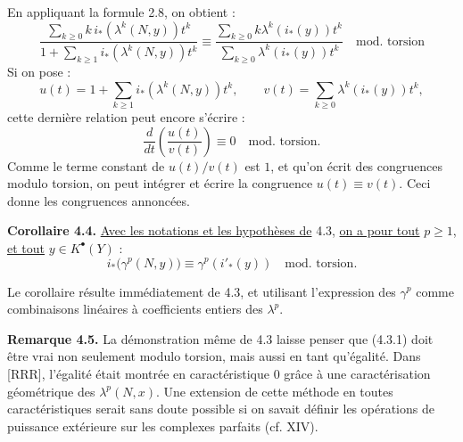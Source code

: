 
En
appliquant la formule 2.8, on obtient :
\[
  \frac{\sum_{k\ge0}k\,i_*(\lambda^k(N,y))t^k}
       {1+\sum_{k\ge1} i_*(\lambda^k(N,y))t^k}
  \equiv
  \frac{\sum_{k\ge0}k\lambda^k(i_*(y))t^k}
       {\sum_{k\ge0}\lambda^k(i_*(y))t^k}
       \quad\text{mod.\ torsion}
\]
Si on pose :
\[
  u(t)=1+\sum_{k\ge1}i_*(\lambda^k(N,y))t^k,\qquad
  v(t)=\sum_{k\ge0}\lambda^k(i_*(y))t^k,
\]
cette dernière relation peut encore s'écrire :
\[
  \frac{d}{dt}\!\left(\frac{u(t)}{v(t)}\right)\equiv0
  \quad\text{mod.\ torsion}.
\]
Comme le terme constant de \(u(t)/v(t)\) est \(1\), et qu'on écrit des congruences modulo torsion, on peut intégrer et écrire la congruence \(u(t)\equiv v(t)\). Ceci donne les congruences annoncées.

\textbf{Corollaire 4.4.} \uline{Avec les notations et les hypothèses de} 4.3, \uline{on a pour tout} \(p\ge1\), \uline{et tout} \(y\in K^{\bullet}(Y)\) :
\[
  i_*\bigl(\gamma^p(N,y)\bigr)\equiv \gamma^p(i'_*(y))
  \quad\text{mod.\ torsion}.
\]

Le corollaire résulte immédiatement de 4.3, et utilisant l'expression des \(\gamma^p\) comme combinaisons linéaires à coefficients entiers des \(\lambda^p\).

\textbf{Remarque 4.5.} La démonstration même de 4.3 laisse penser que (4.3.1) doit être vrai non seulement modulo torsion, mais aussi en tant qu'égalité. Dans [RRR], l'égalité était montrée en caractéristique \(0\) grâce à une caractérisation géométrique des \(\lambda^p(N,x)\). Une extension de cette méthode en toutes caractéristiques serait sans doute possible si on savait définir les opérations de puissance extérieure sur les complexes parfaits (cf. XIV).

